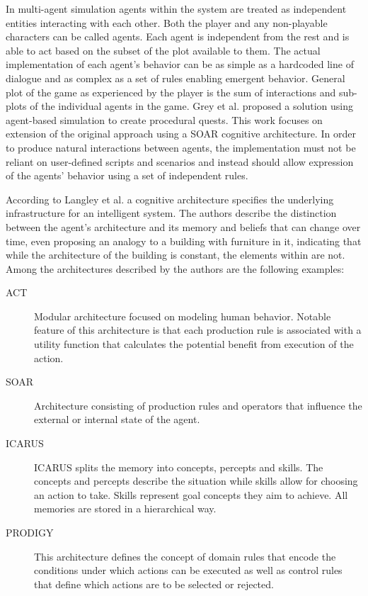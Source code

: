 In multi-agent simulation agents within the system are treated as independent entities interacting with each other.
Both the player and any non-playable characters can be called agents.
Each agent is independent from the rest and is able to act based on the subset of the plot available to them.
The actual implementation of each agent's behavior can be as simple as a hardcoded line of dialogue and as complex as a set of rules enabling emergent behavior.
General plot of the game as experienced by the player is the sum of interactions and sub-plots of the individual agents in the game.
Grey et al.\cite{grey2011procedural} proposed a solution using agent-based simulation to create procedural quests.
This work focuses on extension of the original approach using a SOAR cognitive architecture\cite{rosenbloom1993soar}.
In order to produce natural interactions between agents, the implementation must not be reliant on user-defined scripts and scenarios and instead should allow expression of the agents' behavior using a set of independent rules.

According to Langley et al.\cite{langley2009cognitive} a cognitive architecture specifies the underlying infrastructure for an intelligent system.
The authors describe the distinction between the agent's architecture and its memory and beliefs that can change over time, even proposing an analogy to a building with furniture in it, indicating that while the architecture of the building is constant, the elements within are not.
Among the architectures described by the authors are the following examples:

\begin{description}
    \item[ACT] Modular architecture focused on modeling human behavior. Notable feature of this architecture is that each production rule is associated with a utility function that calculates the potential benefit from execution of the action.
    \item[SOAR] Architecture consisting of production rules and operators that influence the external or internal state of the agent.
    \item[ICARUS] ICARUS splits the memory into concepts, percepts and skills. The concepts and percepts describe the situation while skills allow for choosing an action to take. Skills represent goal concepts they aim to achieve. All memories are stored in a hierarchical way.
    \item[PRODIGY] This architecture defines the concept of domain rules that encode the conditions under which actions can be executed as well as control rules that define which actions are to be selected or rejected.
\end{description}

